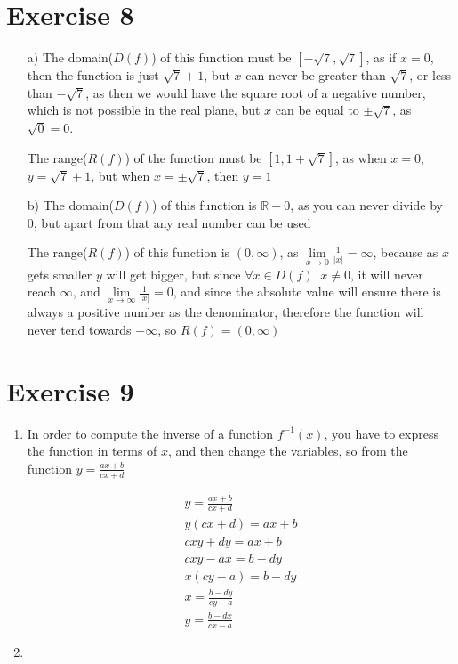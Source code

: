\documentclass[11pt]{article}
\newcommand{\abs}[1]{\ensuremath{|#1| }}
\begin{document}
\section*{Exercise 8}
\label{sec:org33e8865}
\begin{enumerate}
  \item[a)]
        The domain($D(f)$) of this function must be $\left[-\sqrt{7},\sqrt{7}\right]$, as if $x = 0$,  then the function is just $\sqrt{7}+1$, but $x$ can never be greater than $\sqrt{7}$, or less than $-\sqrt{7}$, as then we would have the square root of a negative number, which is not possible in the real plane, but $x$ can be equal to $\pm \sqrt{7}$, as $\sqrt{0} = 0$.

        The range($R(f)$) of the function must be $\left[1,1+\sqrt{7}\right]$, as when $x = 0$, $y = \sqrt{7}+1$, but when $x = \pm \sqrt{7}$,  then $y = 1$
  \item[b)]
        The domain($D(f)$) of this function is $\mathbb{R} - {0}$, as you can never divide by 0, but apart from that any real number can be used

        The range($R(f)$) of this function is $\left(0,\infty\right)$, as $\lim\limits_{x \rightarrow 0}\frac{1}{\abs{x}} = \infty$, because as $x$ gets smaller $y$ will get bigger, but since $\forall x\in D(f)\; \; x \neq 0$, it will never reach $\infty$, and  $\lim\limits_{x \rightarrow \infty}\frac{1}{\abs{x}} = 0$, and since the absolute value will ensure there is always a positive number as the denominator, therefore the function will never tend towards $-\infty$, so $R(f) = \left(0,\infty\right)$
\end{enumerate}
\section*{Exercise 9}
\label{sec:org9e11fd4}
\begin{enumerate}
\item In order to compute the inverse of a function \(f^{-1}(x)\), you have to express the function in terms of \(x\), and then change the variables, so from the function \(y = \frac{ax+b}{cx+d}\)

\begin{gather*}
y = \frac{ax+b}{cx+d} \\
y(cx+d) = ax+b \\
cxy + dy = ax+b \\
cxy - ax =b-dy \\
x(cy-a) = b-dy \\
x = \frac{b-dy}{cy-a}\\
y = \frac{b-dx}{cx-a}
\end{gather*}

\item
\end{enumerate}
\end{document}

